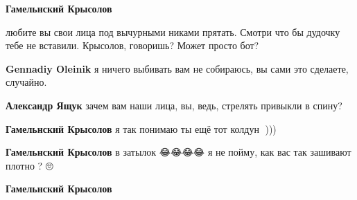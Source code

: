 \begin{itemize}
\begin{itemize}
 
\textbf{Гамельнский Крысолов} 

любите вы свои лица под вычурными никами прятать. Смотри что бы дудочку тебе не
вставили. Крысолов, говоришь? Может просто бот?


 
\textbf{Gennadiy Oleinik} я ничего выбивать вам не собираюсь, вы сами это сделаете, случайно.

 
\textbf{Александр Ящук} зачем вам наши лица, вы, ведь, стрелять привыкли в спину?

 
\textbf{Гамельнский Крысолов} я так понимаю ты ещё тот колдун 🧙)))

 
\textbf{Гамельнский Крысолов} в затылок 😂😂😂😂 я не пойму, как вас так зашивают плотно ? 🙄

 
\textbf{Гамельнский Крысолов} 


\end{itemize}
\end{itemize}
